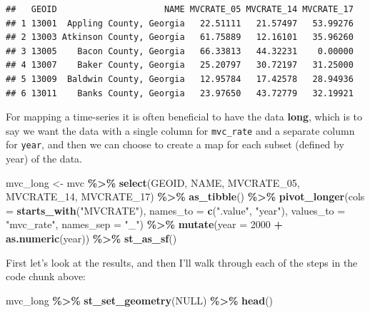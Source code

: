 \documentclass[
]{book}
\newenvironment{Shaded}{\begin{snugshade}}{\end{snugshade}}
\newcommand{\AttributeTok}[1]{\textcolor[rgb]{0.13,0.29,0.53}{#1}}
\newcommand{\ConstantTok}[1]{\textcolor[rgb]{0.56,0.35,0.01}{#1}}
\newcommand{\DecValTok}[1]{\textcolor[rgb]{0.00,0.00,0.81}{#1}}
\newcommand{\FunctionTok}[1]{\textcolor[rgb]{0.13,0.29,0.53}{\textbf{#1}}}
\newcommand{\NormalTok}[1]{#1}
\newcommand{\OtherTok}[1]{\textcolor[rgb]{0.56,0.35,0.01}{#1}}
\newcommand{\SpecialCharTok}[1]{\textcolor[rgb]{0.81,0.36,0.00}{\textbf{#1}}}
\newcommand{\StringTok}[1]{\textcolor[rgb]{0.31,0.60,0.02}{#1}}
\begin{document}
\begin{verbatim}
##   GEOID                     NAME MVCRATE_05 MVCRATE_14 MVCRATE_17
## 1 13001  Appling County, Georgia   22.51111   21.57497   53.99276
## 2 13003 Atkinson County, Georgia   61.75889   12.16101   35.96260
## 3 13005    Bacon County, Georgia   66.33813   44.32231    0.00000
## 4 13007    Baker County, Georgia   25.20797   30.72197   31.25000
## 5 13009  Baldwin County, Georgia   12.95784   17.42578   28.94936
## 6 13011    Banks County, Georgia   23.97650   43.72779   32.19921
\end{verbatim}

For mapping a time-series it is often beneficial to have the data \textbf{long}, which is to say we want the data with a single column for \texttt{mvc\_rate} and a separate column for \texttt{year}, and then we can choose to create a map for each subset (defined by year) of the data.

\begin{Shaded}
\begin{Highlighting}[]
\NormalTok{mvc\_long }\OtherTok{\textless{}{-}}\NormalTok{ mvc }\SpecialCharTok{\%\textgreater{}\%}
  \FunctionTok{select}\NormalTok{(GEOID, NAME, MVCRATE\_05, MVCRATE\_14, MVCRATE\_17) }\SpecialCharTok{\%\textgreater{}\%}
  \FunctionTok{as\_tibble}\NormalTok{() }\SpecialCharTok{\%\textgreater{}\%}
  \FunctionTok{pivot\_longer}\NormalTok{(}\AttributeTok{cols =} \FunctionTok{starts\_with}\NormalTok{(}\StringTok{"MVCRATE"}\NormalTok{),}
               \AttributeTok{names\_to =} \FunctionTok{c}\NormalTok{(}\StringTok{".value"}\NormalTok{, }\StringTok{"year"}\NormalTok{),}
               \AttributeTok{values\_to =} \StringTok{"mvc\_rate"}\NormalTok{,}
               \AttributeTok{names\_sep =} \StringTok{"\_"}\NormalTok{) }\SpecialCharTok{\%\textgreater{}\%}
  \FunctionTok{mutate}\NormalTok{(}\AttributeTok{year =} \DecValTok{2000} \SpecialCharTok{+} \FunctionTok{as.numeric}\NormalTok{(year)) }\SpecialCharTok{\%\textgreater{}\%}
  \FunctionTok{st\_as\_sf}\NormalTok{()}
\end{Highlighting}
\end{Shaded}

First let's look at the results, and then I'll walk through each of the steps in the code chunk above:

\begin{Shaded}
\begin{Highlighting}[]
\NormalTok{mvc\_long }\SpecialCharTok{\%\textgreater{}\%}
  \FunctionTok{st\_set\_geometry}\NormalTok{(}\ConstantTok{NULL}\NormalTok{) }\SpecialCharTok{\%\textgreater{}\%}
  \FunctionTok{head}\NormalTok{()}
\end{Highlighting}
\end{Shaded}
\end{document}
